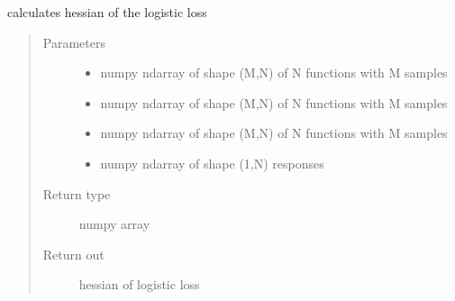 \documentclass[letterpaper,10pt,english]{sphinxmanual}
\begin{document}
\begin{fulllineitems}
\label{\detokenize{regression:regression.logit_hessian}}
calculates hessian of the logistic loss
\begin{quote}\begin{description}
\item[{Parameters}] \leavevmode\begin{itemize}
\item {} 
 \textendash{} numpy ndarray of shape (M,N) of N functions with M samples

\item {} 
 \textendash{} numpy ndarray of shape (M,N) of N functions with M samples

\item {} 
 \textendash{} numpy ndarray of shape (M,N) of N functions with M samples

\item {} 
 \textendash{} numpy ndarray of shape (1,N) responses

\end{itemize}

\item[{Return type}] \leavevmode
numpy array

\item[{Return out}] \leavevmode
hessian of logistic loss

\end{description}\end{quote}

\end{fulllineitems}

\end{document}
